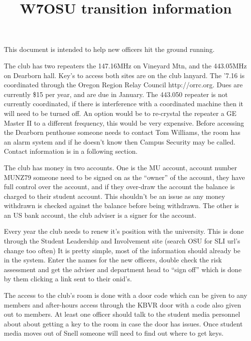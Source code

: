 \documentclass[10pt,letterpaper]{article}
\title{W7OSU transition information}
\begin{document}
 
\maketitle
This document is intended to help new officers hit the ground running. 

The club has two repeaters the 147.16MHz on Vineyard Mtn, and the 443.05MHz on Dearborn hall. Key's to access both sites are on the club lanyard. The '7.16 is coordinated through the Oregon Region Relay Council http://orrc.org. Dues are currently \$15 per year, and are due in January. The 443.050 repeater is not currently coordinated, if there is interference with a coordinated machine then it will need to be turned off. An option would be to re-crystal the repeater a GE Master II to a different frequency, this would be very expensive. Before accessing the Dearborn penthouse someone needs to contact Tom Williams, the room has an alarm system and if he doesn't know then Campus Security may be called. Contact information is in a following section.

The club has money in two accounts. One is the MU account, account number MUNZ79 someone need to be signed on as the ``owner'' of the account, they have full control over the account, and if they over-draw the account the balance is charged to their student account. This shouldn't be an issue as any money withdrawn is checked against the balance before being withdrawn. The other is an US bank account, the club adviser is a signer for the account.

Every year the club needs to renew it's position with the university. This is done through the Student Leadership and Involvement site (search OSU for SLI url's change too often) It is pretty simple, most of the information should already be in the system. Enter the names for the new officers, double check the risk assessment and get the adviser and department head to ``sign off'' which is done by them clicking a link sent to their onid's.

The access to the club's room is done with a door code which can be given to any members and after-hours access through the KBVR door with a code also given out to members. At least one officer should talk to the student media personnel about about getting a key to the room in case the door has issues. Once student media moves out of Snell someone will need to find out where to get keys.
\end{document}
